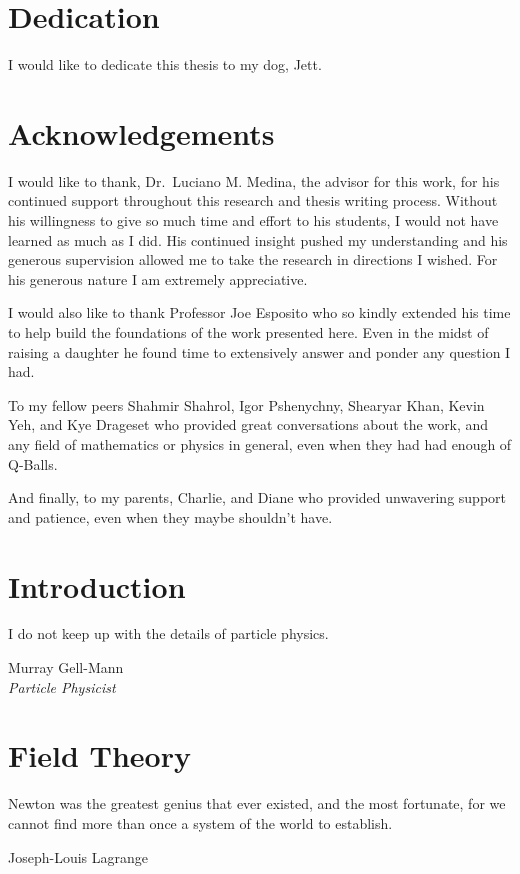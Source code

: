 \documentclass[12pt]{report}
\theoremstyle{definition}
\begin{document}
\thispagestyle{empty}

\listoffigures
\begingroup
\let\clearpage\relax
\listoftables
\endgroup

\chapter*{Dedication}
I would like to dedicate this thesis to my dog, Jett.

\chapter*{Acknowledgements}
I would like to thank, Dr.\ Luciano M. Medina, the advisor for this work, for
his continued support throughout this research and thesis writing process.
Without his willingness to give so much time and effort to his students, I
would not have learned as much as I did. His continued insight pushed my
understanding and his generous supervision allowed me to take the research in
directions I wished. For his generous nature I am extremely appreciative.

I would also like to thank Professor Joe Esposito who so kindly extended his
time to help build the foundations of the work presented here. Even in the midst
of raising a daughter he found time to extensively answer and ponder any
question I had.

To my fellow peers Shahmir Shahrol, Igor Pshenychny, Shearyar Khan, Kevin Yeh,
and Kye Drageset who provided great conversations about the work, and any field
of mathematics or physics in general, even when they had had enough of Q-Balls.

And finally, to my parents, Charlie, and Diane who provided unwavering support
and patience, even when they maybe shouldn't have.


\tableofcontents

\chapter{Introduction}\label{chap:intro}
\epigraph{I do not keep up with the details of particle physics.}{Murray Gell-Mann\\\textit{Particle Physicist}}


\chapter{Field Theory}\label{chap:fields}
\epigraph{Newton was the greatest genius that ever existed, and the most
    fortunate, for we cannot find more than once a system of the world to
    establish.}{Joseph-Louis Lagrange}

\end{document}
